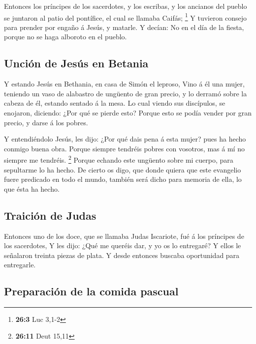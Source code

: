  Entonces los príncipes de los sacerdotes, y los escribas,
y los ancianos del pueblo se juntaron al patio del pontífice, el cual se
llamaba Caifás; \footnote{\textbf{26:3} Luc 3,1-2}  Y
tuvieron consejo para prender por engaño á Jesús, y matarle.
 Y decían: No en el día de la fiesta, porque no se haga
alboroto en el pueblo.

\hypertarget{unciuxf3n-de-jesuxfas-en-betania}{%
\subsection{Unción de Jesús en
Betania}\label{unciuxf3n-de-jesuxfas-en-betania}}

 Y estando Jesús en Bethania, en casa de Simón el leproso,
 Vino á él una mujer, teniendo un vaso de alabastro de
ungüento de gran precio, y lo derramó sobre la cabeza de él, estando
sentado á la mesa.  Lo cual viendo sus discípulos, se
enojaron, diciendo: ¿Por qué se pierde esto?  Porque esto
se podía vender por gran precio, y darse á los pobres.

 Y entendiéndolo Jesús, les dijo: ¿Por qué dais pena á
esta mujer? pues ha hecho conmigo buena obra.  Porque
siempre tendréis pobres con vosotros, mas á mí no siempre me tendréis.
\footnote{\textbf{26:11} Deut 15,11}  Porque echando este
ungüento sobre mi cuerpo, para sepultarme lo ha hecho. 
De cierto os digo, que donde quiera que este evangelio fuere predicado
en todo el mundo, también será dicho para memoria de ella, lo que ésta
ha hecho.

\hypertarget{traiciuxf3n-de-judas}{%
\subsection{Traición de Judas}\label{traiciuxf3n-de-judas}}

 Entonces uno de los doce, que se llamaba Judas
Iscariote, fué á los príncipes de los sacerdotes,  Y les
dijo: ¿Qué me queréis dar, y yo os lo entregaré? Y ellos le señalaron
treinta piezas de plata.  Y desde entonces buscaba
oportunidad para entregarle.

\hypertarget{preparaciuxf3n-de-la-comida-pascual}{%
\subsection{Preparación de la comida
pascual}\label{preparaciuxf3n-de-la-comida-pascual}}

